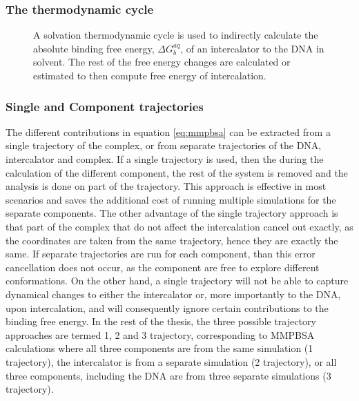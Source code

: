 \subsubsection{The thermodynamic cycle}

\begin{figure}
  \centering
  
  \caption{A solvation thermodynamic cycle is used to indirectly calculate the absolute binding free energy, $\Delta G_{b}^{aq}$, of an intercalator to the DNA in solvent. The rest of the free energy changes are calculated or estimated to then compute free energy of intercalation.}
  \label{fig:mmpbsacycle}
\end{figure}


\subsubsection{Single and Component trajectories}

The different contributions in equation \ref{eq:mmpbsa} can be extracted from a single trajectory of the complex, or from separate trajectories of the DNA, intercalator and complex. If a single trajectory is used, then the during the calculation of the different component, the rest of the system is removed and the analysis is done on part of the trajectory. This approach is effective in most scenarios and saves the additional cost of running multiple simulations for the separate components\cite{foloppe2006towards, wang2001use}. The other advantage of the single trajectory approach is that part of the complex that do not affect the intercalation cancel out exactly, as the coordinates are taken from the same trajectory, hence they are exactly the same. If separate trajectories are run for each component, than this error cancellation does not occur, as the component are free to explore different conformations. On the other hand, a single trajectory will not be able to capture dynamical changes to either the intercalator or, more importantly to the DNA, upon intercalation, and will consequently ignore certain contributions to the binding free energy. In the rest of the thesis, the three possible trajectory approaches are termed 1, 2 and 3 trajectory, corresponding to MMPBSA calculations where all three components are from the same simulation (1 trajectory), the intercalator is from a separate simulation (2 trajectory), or all three components, including the DNA are from three separate simulations (3 trajectory). 
